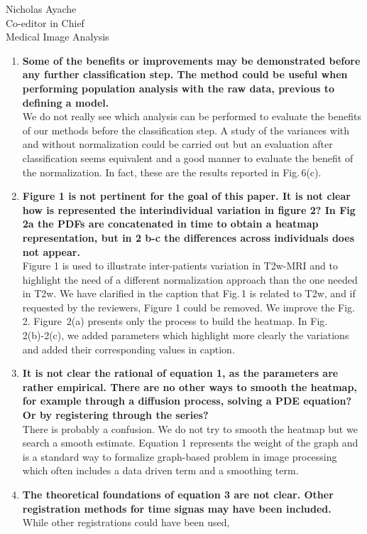 \documentclass{letter}
\begin{document}
\begin{letter}{Nicholas Ayache \\ Co-editor in Chief \\ Medical Image Analysis}
\begin{enumerate}
  \item \textbf{Some of the benefits or improvements may be
      demonstrated before any further classification step. The method
      could be useful when performing population analysis with the raw
      data, previous to defining a model.}\\
    We do not really see which analysis can be performed to evaluate
    the benefits of our methods before the classification step. A study of
    the variances with and without normalization could be carried out but
    an evaluation after classification seems equivalent and a good manner to
    evaluate the benefit of the normalization. In fact, these are the
    results reported in Fig.\,6(c).
  \item \textbf{Figure 1 is not pertinent for the goal of this paper.
      It is not clear how is represented the interindividual variation in
      figure 2?  In Fig 2a the PDFs are concatenated in time to obtain a
      heatmap representation, but in 2 b-c  the differences across
      individuals does not appear.}\\
    Figure 1 is used to illustrate inter-patients variation in T2w-MRI
    and to highlight the need of a different normalization approach
    than the one needed in T2w. We have clarified in the caption that
    Fig.\,1 is related to T2w, and if requested by the reviewers,
    Figure 1 could be removed. We improve the Fig.\,2. Figure~2(a)
    presents only the process to build the
    heatmap. In Fig.\,2(b)-2(c), we added parameters which highlight
    more clearly the variations and added their corresponding values
    in caption.
  \item \textbf{It is not clear the rational of equation 1, as the
      parameters are rather empirical.  There are no other ways to
      smooth the heatmap, for example through a diffusion process,
      solving a PDE equation? Or by registering through the series?}\\
    There is probably a confusion. We do not try to smooth the heatmap
    but we search a smooth estimate. Equation 1 represents the weight
    of the graph and is a standard way to formalize graph-based
    problem in image processing which often includes a data driven
    term and a smoothing term.
  \item \textbf{The theoretical foundations of equation 3 are not
      clear. Other registration methods for time signas may have been
      included.}\\
    While other registrations could have been used,

\end{enumerate}
\end{letter}
\end{document}
